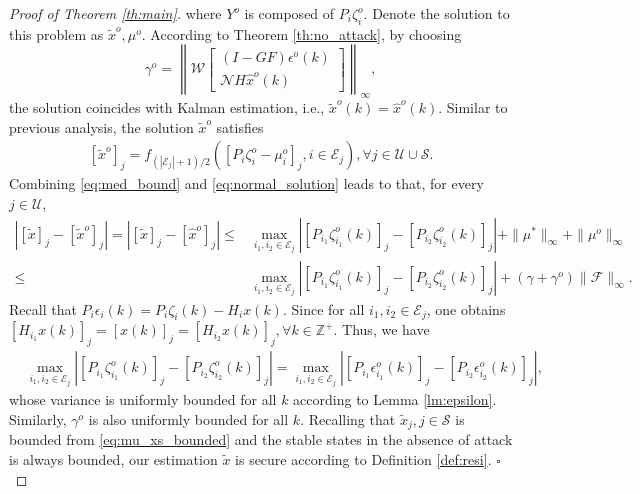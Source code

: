 \documentclass[12pt]{article}  %
\newcommand{\Zb}{{\mathbb{Z}}}
\newcommand{\Ec}{{\mathcal{E}}} %
\newcommand{\Fc}{{\mathcal{F}}}
\newcommand{\Uc}{{\mathcal{U}}}
\newcommand{\Sc}{{\mathcal{S}}}
\newcommand{\Nc}{{\mathcal{N}}}
\newcommand{\Wc}{{\mathcal{W}}}
\newcommand{\ift}{{\infty}}
\newtheorem*{proof}{\textbf{Proof}}
\begin{document}
\begin{proof}[Proof of Theorem \ref{th:main}]
	where ${Y}^o$ is composed of $P_i\zeta_i^o$. Denote the solution to this problem as ${\tilde{x}}^o,\mu^o$.
	According to Theorem \ref{th:no_attack}, by choosing 
	$$\gamma^o=	\left\|\Wc \begin{bmatrix}
	\left(I-GF\right)\epsilon^o(k) \\
	\Nc H \hat{x}^o(k)
	\end{bmatrix}\right\|_\ift, $$
	the solution coincides with Kalman estimation, i.e., $\tilde{x}^o(k)=\hat{x}^o(k)$.
	Similar to previous analysis, the solution $\tilde{x}^o$ satisfies 
	\begin{align}\label{eq:normal_solution}
	[\tilde{x}^o]_j=f_{(|\Ec_j|+1)/2}\left( [P_i\zeta_{i}^o-\mu^o_i]_j, i\in\Ec_j \right), \forall j\in\Uc\cup \Sc.
	\end{align}
	Combining \eqref{eq:med_bound} and \eqref{eq:normal_solution} leads to that, for every $j\in\Uc$,
	\begin{align*}
	\left|[\tilde{x}]_j-[\tilde{x}^o]_j\right| =\left|[\tilde{x}]_j-[\hat{x}^o]_j\right|
	\leq &
	\max_{i_1,i_2\in \Ec_j} \left| \left[P_{i_1} \zeta^o_{i_1}(k)\right]_j- \left[P_{i_2} \zeta^o_{i_2}(k)\right]_j \right| 
	+ \|\mu^*\|_\infty+ \|\mu^o\|_\infty\\
	\leq& \max_{i_1,i_2\in \Ec_j} \left| \left[P_{i_1} \zeta^o_{i_1}(k)\right]_j- \left[P_{i_2} \zeta^o_{i_2}(k)\right]_j \right| +(\gamma+\gamma^o)\|\Fc\|_\ift.
	\end{align*}
	Recall that $P_i\epsilon_{i}(k)=P_i \zeta_i (k)-H_ix(k)$. Since for all $i_1,i_2\in \Ec_j$, one obtains $[H_{i_1}x(k)]_j=[x(k)]_j=[H_{i_2}x(k)]_j,\forall k\in\Zb^+$. Thus, we have
	\begin{align*}
	&\max_{i_1,i_2\in \Ec_j} \left| \left[P_{i_1} \zeta^o_{i_1}(k)\right]_j- \left[P_{i_2} \zeta^o_{i_2}(k)\right]_j \right| =\max_{i_1,i_2\in \Ec_j} \left| \left[P_{i_1} \epsilon^o_{i_1}(k)\right]_j- \left[P_{i_2} \epsilon^o_{i_2}(k)\right]_j \right| ,
	\end{align*}
	whose variance is uniformly bounded for all $k$ according to Lemma \ref{lm:epsilon}. Similarly, $\gamma^o$ is also uniformly bounded for all $k$. 
	Recalling that $\tilde{x}_j,j\in\Sc$ is bounded from \eqref{eq:mu_xs_bounded} and the stable states in the absence of attack is always bounded, our estimation $\tilde{x}$ is secure according to Definition \ref{def:resi}. $\square$
\end{proof}
\end{document}
